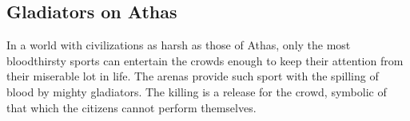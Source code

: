 












\subsection{Gladiators on Athas}

In a world with civilizations as harsh as those of Athas, only the most bloodthirsty sports can entertain the crowds enough to keep their attention from their miserable lot in life. The arenas provide such sport with the spilling of blood by mighty gladiators. The killing is a release for the crowd, symbolic of that which the citizens cannot perform themselves.


